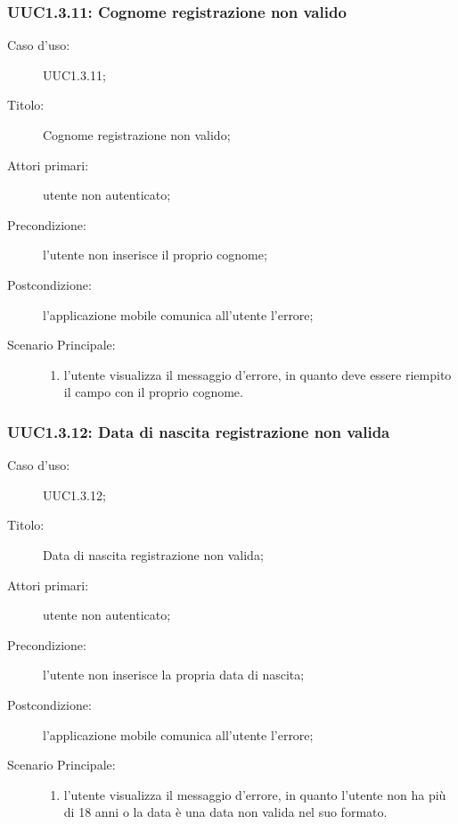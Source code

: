 \documentclass[../../../analisi-dei-requisiti.tex]{subfiles}
\begin{document}
\subsubsection{UUC1.3.11: Cognome registrazione non valido}%
\label{subs:UUC1.3.11}
\begin{description}
  \item[Caso d'uso:] UUC1.3.11;
  \item[Titolo:] Cognome registrazione non valido;
  \item[Attori primari:] utente non autenticato;
  \item[Precondizione:] l'utente non inserisce il proprio cognome;
  \item[Postcondizione:] l'applicazione mobile comunica all'utente l'errore;
  \item[Scenario Principale:]
        \begin{enumerate}
          \item l'utente visualizza il messaggio d'errore, in quanto deve essere riempito il campo con il proprio cognome.
        \end{enumerate}
\end{description}

\subsubsection{UUC1.3.12: Data di nascita registrazione non valida}%
\label{subs:UUC1.3.12}
\begin{description}
  \item[Caso d'uso:] UUC1.3.12;
  \item[Titolo:] Data di nascita registrazione non valida;
  \item[Attori primari:] utente non autenticato;
  \item[Precondizione:] l'utente non inserisce la propria data di nascita;
  \item[Postcondizione:] l'applicazione mobile comunica all'utente l'errore;
  \item[Scenario Principale:]
        \begin{enumerate}
          \item l'utente visualizza il messaggio d'errore, in quanto l'utente non ha più di 18 anni o la data è una data non valida nel suo formato.
        \end{enumerate}
\end{description}
\end{document}

